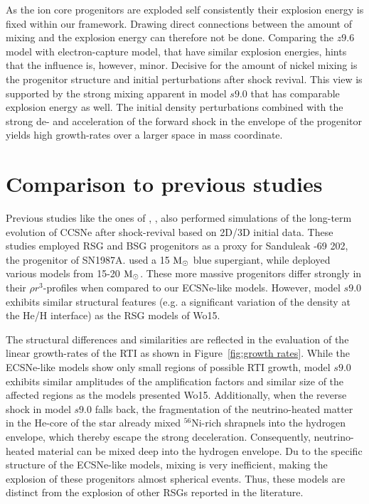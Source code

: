 \documentclass[fleqn,usenatbib]{mnras}
\newcommand{\nickel}{\ensuremath{\mathrm{^{56}Ni}}\xspace}
\newcommand{\solm}{\ensuremath{\rm{M_{\odot}}}\xspace}
\begin{document}
As the ion core progenitors are exploded self consistently their explosion energy is fixed within our framework. Drawing direct connections between the amount of mixing and the explosion energy can therefore not be done. Comparing the $z9.6$ model with electron-capture model, that have similar explosion energies, hints that the influence is, however, minor. Decisive for the amount of nickel mixing is the progenitor structure and initial perturbations after shock revival. This view is supported by the strong mixing apparent in model $s9.0$ that has comparable explosion energy as well. The initial density perturbations combined with the strong de- and acceleration of the forward shock in the envelope of the progenitor yields high growth-rates over a larger space in mass coordinate. 


\section{Comparison to previous studies}
\label{sec:Comparison to previous studies}

Previous studies like the ones of \cite{Hammer2010}, \citet{Wongwathanarat2015}, \citet{Kifonidis2006} also performed simulations of the long-term evolution of CCSNe after shock-revival based on 2D/3D initial data. These studies employed RSG and BSG progenitors as a proxy for Sanduleak -69 202, the progenitor of SN1987A. \citet{Hammer2010} used a 15 \solm blue supergiant, while \citet{Wongwathanarat2015}  deployed various models from 15-20 \solm. 
These more massive progenitors differ strongly in their $\rho r^3$-profiles when compared to our ECSNe-like models. However, model $s9.0$ exhibits similar structural features (e.g. a significant variation of the density at the He/H interface) as the RSG models of Wo15.

The structural differences and similarities are reflected in the evaluation of the linear growth-rates of the RTI as shown in Figure~\ref{fig:growth rates}. While the ECSNe-like models show only small regions of possible RTI growth, model $s9.0$ exhibits similar amplitudes of the amplification factors and similar size of the affected regions as the models presented Wo15. Additionally, when the reverse shock in model $s9.0$ falls back, the fragmentation of the neutrino-heated matter in the He-core of the star already mixed \nickel-rich shrapnels into the hydrogen envelope, which thereby escape the strong deceleration. 
Consequently, neutrino-heated material can be mixed deep into the hydrogen envelope. 
Du to the specific structure of the ECSNe-like models, mixing is very inefficient, making the explosion of these progenitors almost spherical events. Thus, these models are distinct from the explosion of other RSGs reported in the literature. 
\end{document}
